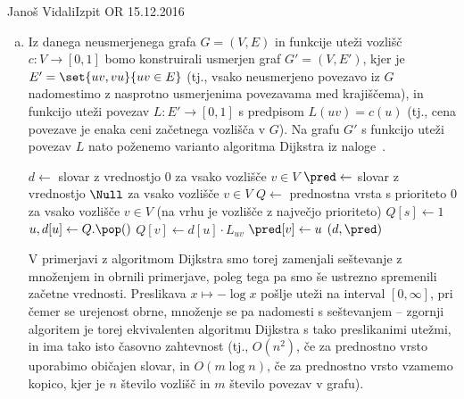 \begin{naloga}{Janoš Vidali}{Izpit OR 15.12.2016}
\begin{odgovor}
\begin{enumerate}[(a)]
\item Iz danega neusmerjenega grafa $G = (V, E)$
in funkcije uteži vozlišč $c : V \to [0, 1]$
bomo konstruirali usmerjen graf $G' = (V, E')$,
kjer je $E' = \set{uv, vu}{uv \in E}$
(tj., vsako neusmerjeno povezavo iz $G$
nadomestimo z nasprotno usmerjenima povezavama med krajiščema),
in funkcijo uteži povezav $L : E' \to [0, 1]$ s predpisom $L(uv) = c(u)$
(tj., cena povezave je enaka ceni začetnega vozlišča v $G$).
Na grafu $G'$ s funkcijo uteži povezav $L$
nato poženemo varianto algoritma {\sc Dijkstra} iz naloge~\res[dijkstra].
\begin{small}
\begin{algorithmic}
    \State $d \gets$ slovar z vrednostjo $0$ za vsako vozlišče $v \in V$
    \State $\pred \gets$ slovar z vrednostjo $\Null$
        za vsako vozlišče $v \in V$
	\State $Q \gets$ prednostna vrsta
        s prioriteto $0$ za vsako vozlišče $v \in V$
        (na vrhu je vozlišče z največjo prioriteto)
	\State $Q[s] \gets 1$
		\State $u, d[u] \gets Q.\pop()$
				\State $Q[v] \gets d[u] \cdot L_{uv}$
                \State $\pred[v] \gets u$
			\EndIf
		\EndFor
	\EndWhile
    \State \Return $(d, \pred)$
\EndFunction
\end{algorithmic}
\end{small}
V primerjavi z algoritmom {\sc Dijkstra}
smo torej zamenjali seštevanje z množenjem in obrnili primerjave,
poleg tega pa smo še ustrezno spremenili začetne vrednosti.
Preslikava $x \mapsto -\log x$ pošlje uteži na interval $[0, \infty]$,
pri čemer se urejenost obrne, množenje se pa nadomesti s seštevanjem
-- zgornji algoritem je torej ekvivalenten
algoritmu {\sc Dijkstra} s tako preslikanimi utežmi,
in ima tako isto časovno zahtevnost
(tj., $O(n^2)$, če za prednostno vrsto uporabimo običajen slovar,
in $O(m \log n)$, če za prednostno vrsto vzamemo kopico,
kjer je $n$ število vozlišč in $m$ število povezav v grafu).


\end{enumerate}
\end{odgovor}
\end{naloga}
